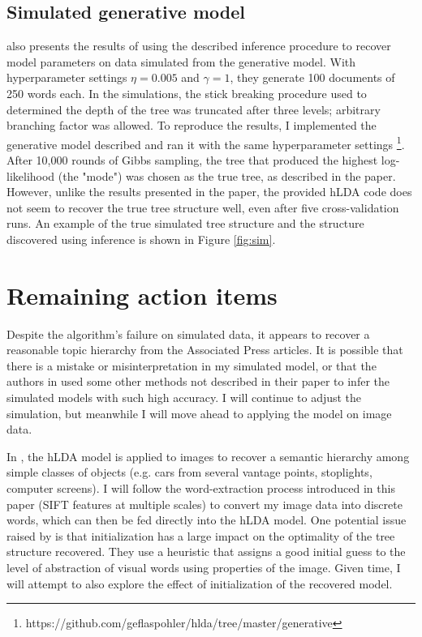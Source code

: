 \documentclass{article}
\begin{document}
\subsection{Simulated generative model}
\citet{Blei2010} also presents the results of using the described inference procedure to recover model parameters on data simulated from the generative model. With hyperparameter settings $\eta = 0.005$ and $\gamma = 1$, they generate 100 documents of 250 words each. In the simulations, the stick breaking procedure used to determined the depth of the tree was truncated after three levels; arbitrary branching factor was allowed. To reproduce the results, I implemented the generative model described and ran it with the same hyperparameter settings \footnote{https://github.com/geflaspohler/hlda/tree/master/generative}. After 10,000 rounds of Gibbs sampling, the tree that produced the highest log-likelihood (the "mode") was chosen as the true tree, as described in the paper. However, unlike the results presented in the paper, the provided hLDA code does not seem to recover the true tree structure well, even after five cross-validation runs. An example of the true simulated tree structure and the structure discovered using inference is shown in Figure \ref{fig:sim}.

\section{Remaining action items}
Despite the algorithm's failure on simulated data, it appears to recover a reasonable topic hierarchy from the Associated Press articles. It is possible that there is a mistake or misinterpretation in my simulated model, or that the authors in \citet{Blei2010} used some other methods not described in their paper to infer the simulated models with such high accuracy. I will continue to adjust the simulation, but meanwhile I will move ahead to applying the model on image data.

In \citet{Sivic}, the hLDA model is applied to images to recover a semantic hierarchy among simple classes of objects (e.g. cars from several vantage points, stoplights, computer screens). I will follow the word-extraction process introduced in this paper (SIFT features at multiple scales) to convert my image data into discrete words, which can then be fed directly into the hLDA model. One potential issue raised by \citet{Sivic} is that initialization has a large impact on the optimality of the tree structure recovered. They use a heuristic that assigns a good initial guess to the level of abstraction of visual words using properties of the image. Given time, I will attempt to also explore the effect of initialization of the recovered model. 
\end{document}
